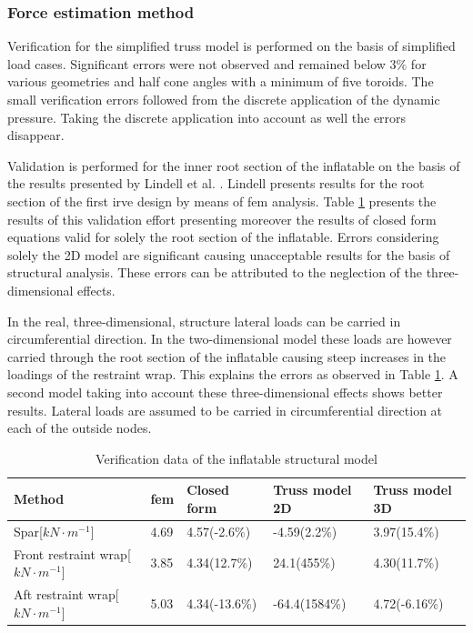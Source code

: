 \subsubsection{Force estimation method}

Verification for the simplified truss model is performed on the basis of simplified load cases. Significant errors were not observed and remained below $3\%$ for various geometries and half cone angles with a minimum of five toroids. The small verification errors followed from the discrete application of the dynamic pressure. Taking the discrete application into account as well the errors disappear.

Validation is performed for the inner root section of the inflatable on the basis of the results presented by Lindell et al. \cite{Lindell2006}. Lindell presents results for the root section of the first \gls{irve} design by means of \gls{fem} analysis. Table \ref{tab:struc_val} presents the results of this validation effort presenting moreover the results of closed form equations valid for solely the root section of the inflatable. Errors considering solely the 2D model are significant causing unacceptable results for the basis of structural analysis. These errors can be attributed to the neglection of the three-dimensional effects. 

In the real, three-dimensional, structure lateral loads can be carried in circumferential direction. In the two-dimensional model these loads are however carried through the root section of the inflatable causing steep increases in the loadings of the restraint wrap. This explains the errors as observed in Table \ref{tab:struc_val}. A second model taking into account these three-dimensional effects shows better results. Lateral loads are assumed to be carried in circumferential direction at each of the outside nodes. 

\begin{table}[h]
\caption{Verification data of the inflatable structural model}
\hspace{-5mm}
\begin{tabular}{|l|l|l|l|l|} \hline
Method                            & \gls{fem}\cite{Lindell2006} & Closed form\cite{Lindell2006} & Truss model 2D & Truss model 3D \\ \hline \hline
Spar[$kN\cdot m^{-1}$]& 4.69                     & 4.57(-2.6\%)                     & -4.59(2.2\%)   & 3.97(15.4\%)   \\ \hline
Front restraint wrap[$kN\cdot m^{-1}$]& 3.85                     & 4.34(12.7\%)                     & 24.1(455\%)    & 4.30(11.7\%)   \\ \hline
Aft restraint wrap[$kN\cdot m^{-1}$]& 5.03                     & 4.34(-13.6\%)                    & -64.4(1584\%)  & 4.72(-6.16\%) \\ \hline
\end{tabular}
\label{tab:struc_val} 
\end{table}

